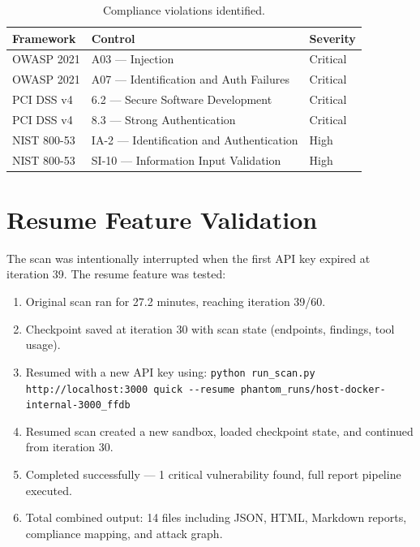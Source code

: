 \documentclass[12pt,a4paper,twoside]{report}
\begin{document}
\begin{table}[H]
\centering
\caption{Compliance violations identified.}
\label{tab:compliance}
\begin{tabular}{lll}
\toprule
\textbf{Framework} & \textbf{Control} & \textbf{Severity} \\
\midrule
OWASP 2021 & A03 --- Injection                              & Critical \\
OWASP 2021 & A07 --- Identification and Auth Failures        & Critical \\
PCI DSS v4 & 6.2 --- Secure Software Development             & Critical \\
PCI DSS v4 & 8.3 --- Strong Authentication                   & Critical \\
NIST 800-53 & IA-2 --- Identification and Authentication     & High \\
NIST 800-53 & SI-10 --- Information Input Validation          & High \\
\bottomrule
\end{tabular}
\end{table}

\section{Resume Feature Validation}

The scan was intentionally interrupted when the first API key expired at iteration 39. The resume feature was tested:

\begin{successbox}
\begin{enumerate}
    \item Original scan ran for 27.2 minutes, reaching iteration 39/60.
    \item Checkpoint saved at iteration 30 with scan state (endpoints, findings, tool usage).
    \item Resumed with a new API key using: \texttt{python run\_scan.py http://localhost:3000 quick -{}-resume phantom\_runs/host-docker-internal-3000\_ffdb}
    \item Resumed scan created a new sandbox, loaded checkpoint state, and continued from iteration 30.
    \item Completed successfully --- 1 critical vulnerability found, full report pipeline executed.
    \item Total combined output: 14 files including JSON, HTML, Markdown reports, compliance mapping, and attack graph.
\end{enumerate}
\end{successbox}
\end{document}
